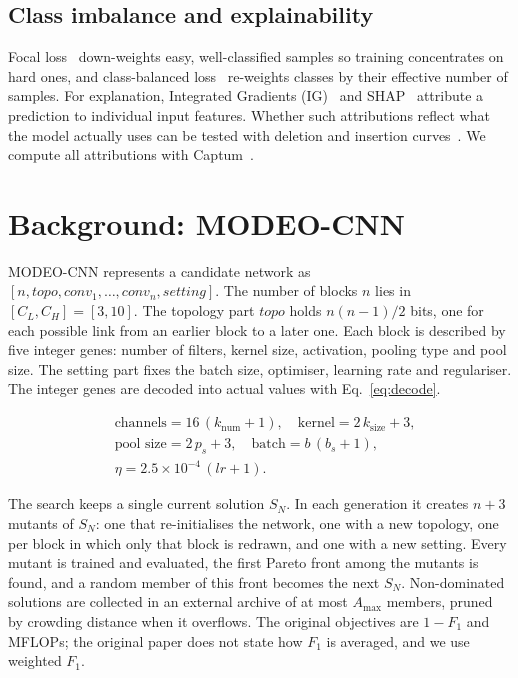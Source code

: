 \documentclass[10pt,twocolumn,letterpaper]{article}
\begin{document}
\subsection{Class imbalance and explainability}
Focal loss~\cite{lin2017focal} down-weights easy, well-classified samples
so training concentrates on hard ones, and class-balanced
loss~\cite{cui2019cb} re-weights classes by their effective number of
samples. For explanation, Integrated Gradients (IG)~\cite{sundararajan2017ig}
and SHAP~\cite{lundberg2017shap} attribute a prediction to individual
input features. Whether such attributions reflect what the model actually
uses can be tested with deletion and insertion curves~\cite{petsiuk2018rise}.
We compute all attributions with Captum~\cite{kokhlikyan2020captum}.


\section{Background: MODEO-CNN}\label{sec:background}

MODEO-CNN represents a candidate network as
$[n, \mathit{topo}, \mathit{conv}_1, \dots, \mathit{conv}_n, \mathit{setting}]$.
The number of blocks $n$ lies in $[C_L, C_H] = [3, 10]$. The topology part
$\mathit{topo}$ holds $n(n-1)/2$ bits, one for each possible link from an
earlier block to a later one. Each block is described by five integer
genes: number of filters, kernel size, activation, pooling type and pool
size. The setting part fixes the batch size, optimiser, learning rate and
regulariser. The integer genes are decoded into actual values with
Eq.~\eqref{eq:decode}.

\begin{equation}\label{eq:decode}
\begin{aligned}
&\text{channels} = 16\,(k_{\mathrm{num}}+1), \quad \text{kernel} = 2\,k_{\mathrm{size}}+3,\\
&\text{pool size} = 2\,p_s+3, \quad \text{batch} = b\,(b_s+1),\\
&\eta = 2.5\times10^{-4}\,(lr+1).
\end{aligned}
\end{equation}

The search keeps a single current solution $S_N$. In each generation it
creates $n+3$ mutants of $S_N$: one that re-initialises the network, one
with a new topology, one per block in which only that block is redrawn,
and one with a new setting. Every mutant is trained and evaluated, the
first Pareto front among the mutants is found, and a random member of
this front becomes the next $S_N$. Non-dominated solutions are collected
in an external archive of at most $A_{\max}$ members, pruned by crowding
distance when it overflows. The original objectives are $1-F_1$ and MFLOPs; the original paper does
not state how $F_1$ is averaged, and we use weighted $F_1$.
\end{document}
